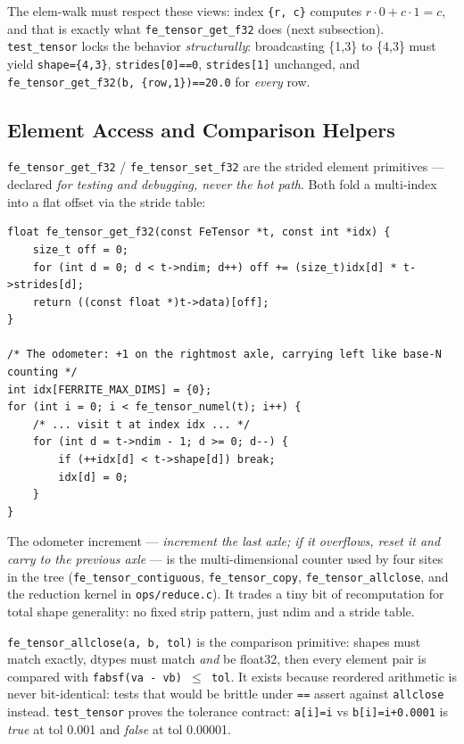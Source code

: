 \documentclass[11pt,a4paper]{article}
\begin{document}
The elem-walk must respect these views: index \texttt{\{r, c\}} computes
$r\cdot 0 + c\cdot 1 = c$, and that is exactly what \texttt{fe\_tensor\_get\_f32}
does (next subsection). \texttt{test\_tensor} locks the behavior
\emph{structurally}: broadcasting \{1,3\} to \{4,3\} must yield
\texttt{shape=\{4,3\}}, \texttt{strides[0]==0}, \texttt{strides[1]} unchanged,
and \texttt{fe\_tensor\_get\_f32(b, \{row,1\})==20.0} for \emph{every} row.

\subsection{Element Access and Comparison Helpers}

\texttt{fe\_tensor\_get\_f32} / \texttt{fe\_tensor\_set\_f32} are the strided
element primitives --- declared \emph{for testing and debugging, never the hot
path}. Both fold a multi-index into a flat offset via the stride table:

\begin{lstlisting}[style=cstyle,caption={core/tensor.c --- strided element access}]
float fe_tensor_get_f32(const FeTensor *t, const int *idx) {
    size_t off = 0;
    for (int d = 0; d < t->ndim; d++) off += (size_t)idx[d] * t->strides[d];
    return ((const float *)t->data)[off];
}

/* The odometer: +1 on the rightmost axle, carrying left like base-N counting */
int idx[FERRITE_MAX_DIMS] = {0};
for (int i = 0; i < fe_tensor_numel(t); i++) {
    /* ... visit t at index idx ... */
    for (int d = t->ndim - 1; d >= 0; d--) {
        if (++idx[d] < t->shape[d]) break;
        idx[d] = 0;
    }
}
\end{lstlisting}

The odometer increment --- \emph{increment the last axle; if it overflows,
reset it and carry to the previous axle} --- is the multi-dimensional counter
used by four sites in the tree (\texttt{fe\_tensor\_contiguous},
\texttt{fe\_tensor\_copy}, \texttt{fe\_tensor\_allclose}, and the reduction
kernel in \texttt{ops/reduce.c}). It trades a tiny bit of recomputation for
total shape generality: no fixed strip pattern, just ndim and a stride table.

\texttt{fe\_tensor\_allclose(a, b, tol)} is the comparison primitive: shapes must
match exactly, dtypes must match \emph{and} be float32, then every element pair
is compared with \texttt{fabsf(va - vb) \(\le\) tol}. It exists because
reordered arithmetic is never bit-identical: tests that would be brittle under
\texttt{==} assert against \texttt{allclose} instead. \texttt{test\_tensor}
proves the tolerance contract: \texttt{a[i]=i} vs \texttt{b[i]=i+0.0001} is
\emph{true} at tol 0.001 and \emph{false} at tol 0.00001.
\end{document}
